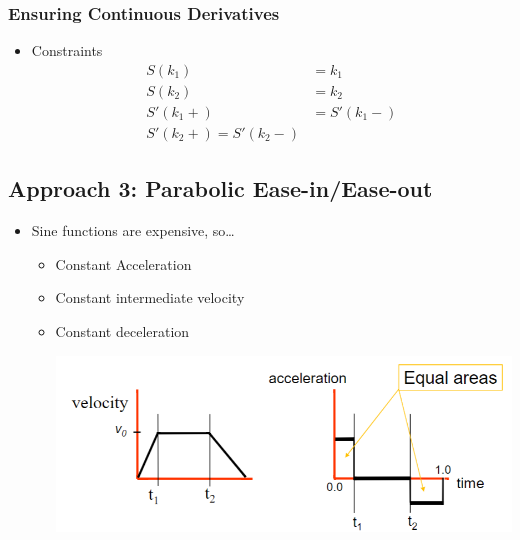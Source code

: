\documentclass{article}
\begin{document}
\subsubsection*{Ensuring Continuous Derivatives}
\begin{itemize}
    \item Constraints
    \begin{align*}
        S(k_1) &= k_1\\
        S(k_2) &= k_2\\
        S'(k_1+) &= S'(k_1-)\\
        S'(k_2+) = S'(k_2-)
    \end{align*}
\end{itemize}
\subsection*{Approach 3: Parabolic Ease-in/Ease-out}
\begin{itemize}
    \item Sine functions are expensive, so\dots
    \begin{itemize}
        \item Constant Acceleration
        \item Constant intermediate velocity
        \item Constant deceleration
        \begin{center}
            \includegraphics*[scale=0.7]{W4_8.png}
        \end{center}
    \end{itemize}
\end{itemize}
\end{document}
